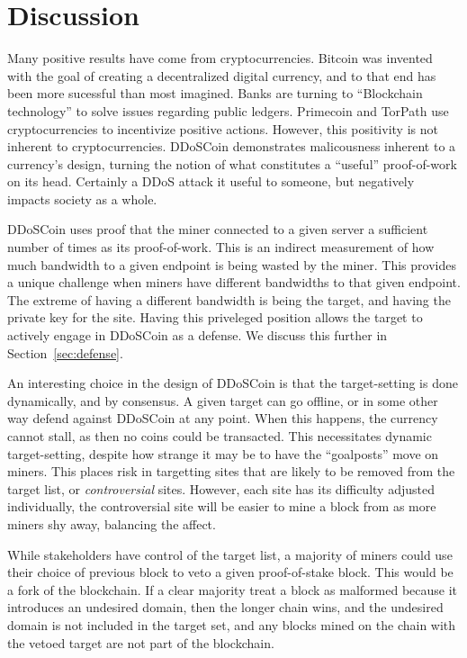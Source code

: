 \section{Discussion}


Many positive results have come from cryptocurrencies.
Bitcoin was invented with the goal of creating a decentralized digital currency, 
and to that end has been more sucessful than most imagined. Banks are turning
to ``Blockchain technology'' to solve issues regarding public ledgers.
Primecoin and TorPath use cryptocurrencies to incentivize positive actions.
However, this positivity is not inherent to cryptocurrencies. DDoSCoin demonstrates
malicousness inherent to a currency's design, turning the notion of what constitutes
a ``useful'' proof-of-work on its head. Certainly a DDoS attack it useful to someone,
but negatively impacts society as a whole.

DDoSCoin uses proof that the miner connected to a given server a sufficient number 
of times as its proof-of-work. This is an indirect measurement of how much bandwidth
to a given endpoint is being wasted by the miner. This provides a unique challenge
when miners have different bandwidths to that given endpoint. The extreme of 
having a different bandwidth is being the target, and having the private key 
for the site. Having this priveleged position allows 
the target to actively engage in DDoSCoin as a defense. We discuss this further in
Section~\ref{sec:defense}.

An interesting choice in the design of DDoSCoin is that the target-setting is done 
dynamically, and by consensus. A given target can go offline, or in some other way
defend against DDoSCoin at any point. When this happens, the currency cannot stall,
as then no coins could be transacted. This necessitates dynamic target-setting, 
despite how strange it may be to have the ``goalposts'' move on miners. This places
risk in targetting sites that are likely to be removed from the target list, or
\emph{controversial} sites. However, each site has its difficulty adjusted 
individually, the controversial site will be easier to mine a block from as more 
miners shy away, balancing the affect. 

While stakeholders have control of the target list, a majority of miners could
use their choice of previous block to veto a given proof-of-stake block. This would
be a fork of the blockchain. If a clear majority treat a block as malformed because
it introduces an undesired domain, then the longer chain wins, and the undesired
domain is not included in the target set, and any blocks mined on the chain with
the vetoed target are not part of the blockchain.

